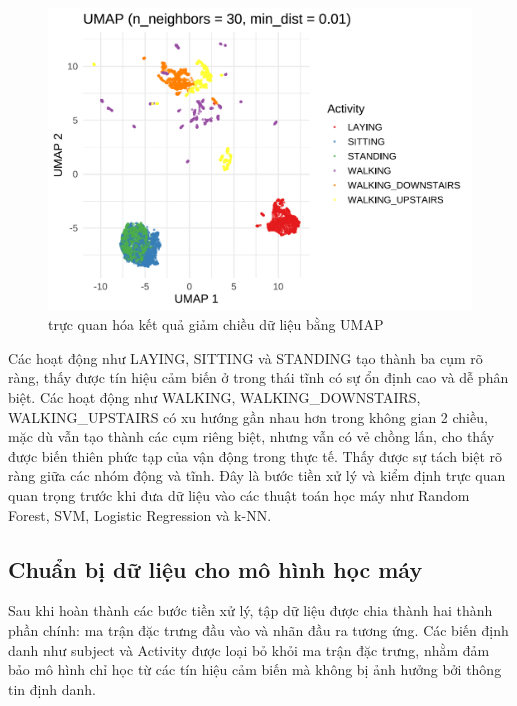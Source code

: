 \documentclass[
]{article}
\begin{document}
\begin{figure}
\centering
\includegraphics{report_files/figure-latex/unnamed-chunk-22-1.pdf}
\caption{trực quan hóa kết quả giảm chiều dữ liệu bằng UMAP}
\end{figure}

Các hoạt động như LAYING, SITTING và STANDING tạo thành ba cụm rõ ràng,
thấy được tín hiệu cảm biến ở trong thái tĩnh có sự ổn định cao và dễ
phân biệt. Các hoạt động như WALKING, WALKING\_DOWNSTAIRS,
WALKING\_UPSTAIRS có xu hướng gần nhau hơn trong không gian 2 chiều, mặc
dù vẫn tạo thành các cụm riêng biệt, nhưng vẫn có vẻ chồng lấn, cho thấy
được biến thiên phức tạp của vận động trong thực tế. Thấy được sự tách
biệt rõ ràng giữa các nhóm động và tĩnh. Đây là bước tiền xử lý và kiểm
định trực quan quan trọng trước khi đưa dữ liệu vào các thuật toán học
máy như Random Forest, SVM, Logistic Regression và k-NN.

\subsection{Chuẩn bị dữ liệu cho mô hình học
máy}\label{chuux1ea9n-bux1ecb-dux1eef-liux1ec7u-cho-muxf4-huxecnh-hux1ecdc-muxe1y}

Sau khi hoàn thành các bước tiền xử lý, tập dữ liệu được chia thành hai
thành phần chính: ma trận đặc trưng đầu vào và nhãn đầu ra tương ứng.
Các biến định danh như subject và Activity được loại bỏ khỏi ma trận đặc
trưng, nhằm đảm bảo mô hình chỉ học từ các tín hiệu cảm biến mà không bị
ảnh hưởng bởi thông tin định danh.
\end{document}
